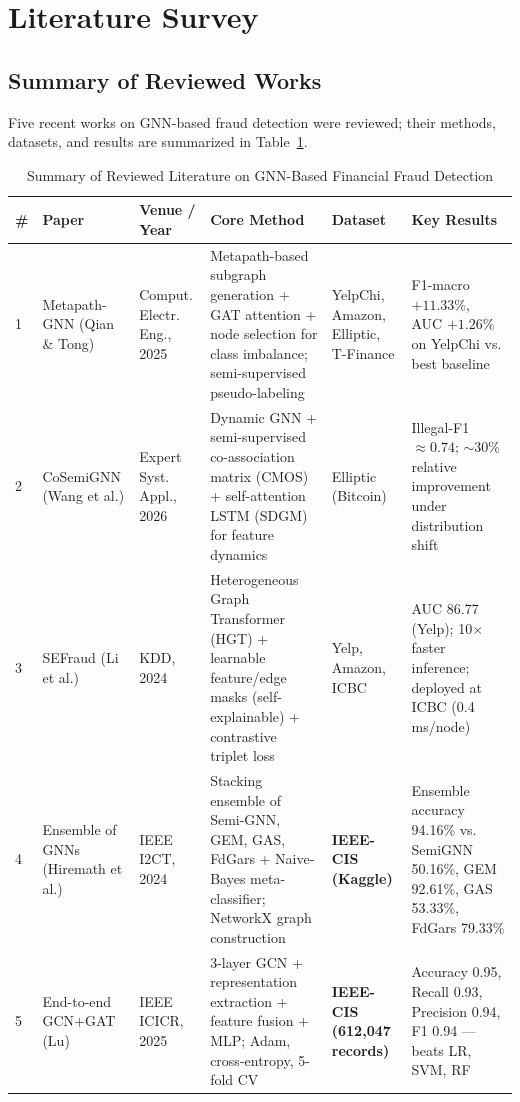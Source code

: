 \documentclass[conference]{IEEEtran}
\begin{document}
\section{Literature Survey}
\subsection{Summary of Reviewed Works}
Five recent works on GNN-based fraud detection were reviewed; their
methods, datasets, and results are summarized in
Table~\ref{tab:literature}.

\begin{table}[htbp]
\caption{Summary of Reviewed Literature on GNN-Based Financial Fraud Detection}
\label{tab:literature}
\centering
\scriptsize
\begin{tabular}{p{0.4cm}p{2.2cm}p{1.8cm}p{4.2cm}p{2.6cm}p{4.3cm}}
\hline
\textbf{\#} & \textbf{Paper} & \textbf{Venue / Year} & \textbf{Core Method} &
\textbf{Dataset} & \textbf{Key Results} \\
\hline
1 & Metapath-GNN (Qian \& Tong) \cite{qian2025metapath} & Comput. Electr.
Eng., 2025 & Metapath-based subgraph generation + GAT attention + node
selection for class imbalance; semi-supervised pseudo-labeling & YelpChi,
Amazon, Elliptic, T-Finance & F1-macro $+11.33\%$, AUC $+1.26\%$ on YelpChi
vs. best baseline \\
2 & CoSemiGNN (Wang et al.) \cite{wang2026cosemignn} & Expert Syst. Appl.,
2026 & Dynamic GNN + semi-supervised co-association matrix (CMOS) +
self-attention LSTM (SDGM) for feature dynamics & Elliptic (Bitcoin) &
Illegal-F1 $\approx 0.74$; $\sim$30\% relative improvement under
distribution shift \\
3 & SEFraud (Li et al.) \cite{li2024sefraud} & KDD, 2024 & Heterogeneous
Graph Transformer (HGT) + learnable feature/edge masks (self-explainable) +
contrastive triplet loss & Yelp, Amazon, ICBC & AUC 86.77 (Yelp);
10$\times$ faster inference; deployed at ICBC (0.4 ms/node) \\
4 & Ensemble of GNNs (Hiremath et al.) \cite{hiremath2024ensemble} & IEEE
I2CT, 2024 & Stacking ensemble of Semi-GNN, GEM, GAS, FdGars + Naive-Bayes
meta-classifier; NetworkX graph construction & \textbf{IEEE-CIS (Kaggle)} &
Ensemble accuracy 94.16\% vs. SemiGNN 50.16\%, GEM 92.61\%, GAS 53.33\%,
FdGars 79.33\% \\
5 & End-to-end GCN+GAT (Lu) \cite{lu2025gnn} & IEEE ICICR, 2025 & 3-layer
GCN + representation extraction + feature fusion + MLP; Adam,
cross-entropy, 5-fold CV & \textbf{IEEE-CIS (612{,}047 records)} & Accuracy
0.95, Recall 0.93, Precision 0.94, F1 0.94 --- beats LR, SVM, RF \\
\hline
\end{tabular}
\end{table}
\end{document}
